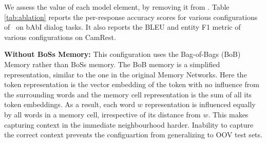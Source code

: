 We assess the value of each model element, by removing it from \sys. Table \ref{tab:ablation} reports the per-response accuracy scores for various configurations of \sys\ on bAbI dialog tasks. It also reports the BLEU and entity F1 metric of various configurations on CamRest.

\noindent \textbf{Without BoSs Memory:} 
This configuration uses the Bag-of-Bags (BoB) Memory rather than {\sc BoSs} memory. The BoB memory is a simplified representation, similar to the one in the original Memory Networks. Here the token representation is the vector embedding of the token with no influence from the surrounding words and the memory cell representation is the sum of all its token embeddings. As a result, each word $w$ representation is influenced equally by all words in a memory cell, irrespective of its distance from $w$. This makes capturing context in the immediate neighbourhood harder. Inability to capture the correct context prevents the configuartion from generalizing to OOV test sets.

